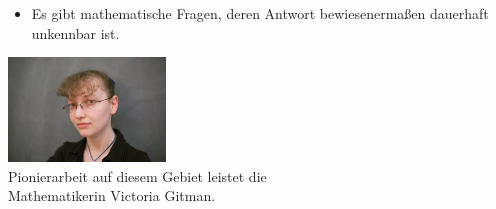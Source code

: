 \documentclass[12pt,compress,ngerman,utf8,t]{beamer}
\begin{document}
\begin{frame}
\begin{itemize}
\bigskip

    \item Es gibt mathematische Fragen, deren Antwort bewiesenermaßen dauerhaft
    unkennbar ist.
  \end{itemize}

  \bigskip
  \centering
  \includegraphics[height=7.5em]{victoria-gitman} \\
  \scriptsize
  Pionierarbeit auf diesem Gebiet leistet die \\
  Mathematikerin Victoria Gitman.
  \par
\end{frame}
\addtocounter{framenumber}{-1}
\end{document}

